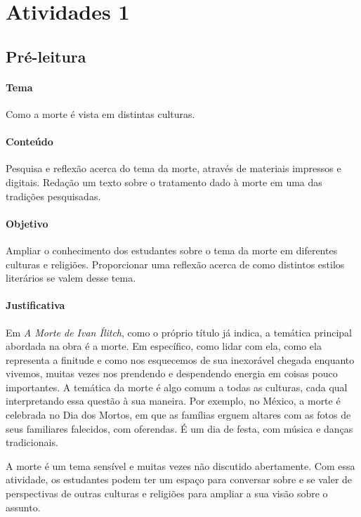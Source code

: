\documentclass[12pt]{extarticle}
\begin{document}
\section{Atividades 1}


\subsection{Pré-leitura}


\paragraph{Tema} Como a morte é vista em distintas culturas.

\paragraph{Conteúdo} Pesquisa e reflexão acerca do tema da morte, 
através de materiais impressos e digitais. Redação um texto
sobre o tratamento dado à morte em uma das tradições pesquisadas. 

\paragraph{Objetivo} Ampliar o conhecimento dos estudantes sobre o tema da morte
em diferentes culturas e religiões. Proporcionar uma reflexão acerca
de como distintos estilos literários se valem desse tema.

\paragraph{Justificativa} Em \emph{A Morte de Ivan Ílitch}, como o próprio título já
indica, a temática principal abordada na obra é a morte. Em específico,
como lidar com ela, como ela representa a finitude e como nos esquecemos
de sua inexorável chegada enquanto vivemos, muitas vezes nos prendendo e
despendendo energia em coisas pouco importantes. A temática da morte é
algo comum a todas as culturas, cada qual interpretando essa questão à
sua maneira. Por exemplo, no México, a morte é celebrada no Dia dos Mortos, em que
as famílias erguem altares com as fotos de seus familiares falecidos, com oferendas.
É um dia de festa, com música e danças tradicionais.

A morte é um tema sensível e muitas vezes não discutido abertamente. Com essa atividade,
os estudantes podem ter um espaço para conversar sobre e se valer de 
perspectivas de outras culturas e religiões para ampliar a sua visão sobre o assunto.
\end{document}
